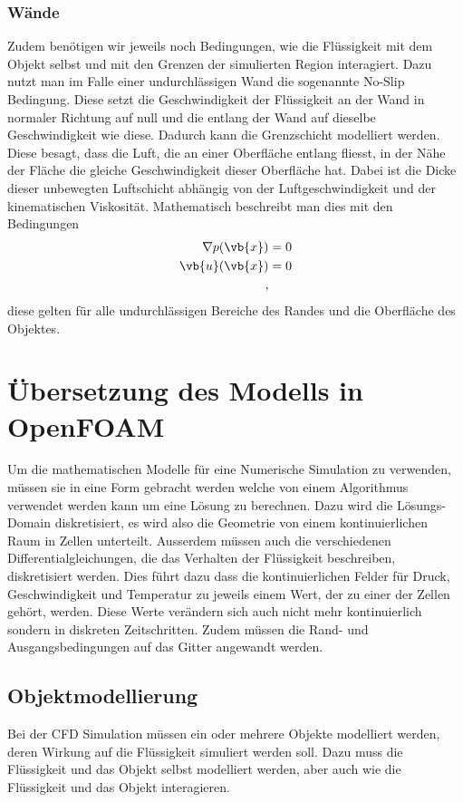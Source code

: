 \subsubsection{Wände}
Zudem benötigen wir jeweils noch Bedingungen, wie die Flüssigkeit mit dem Objekt selbst und mit den Grenzen der simulierten Region interagiert.
Dazu nutzt man im Falle einer undurchlässigen Wand die sogenannte No-Slip Bedingung. 
Diese setzt die Geschwindigkeit der Flüssigkeit an der Wand in normaler Richtung auf null und die entlang der Wand auf dieselbe Geschwindigkeit wie diese.
Dadurch kann die Grenzschicht modelliert werden. Diese besagt, dass die Luft, die an einer Oberfläche entlang fliesst, in der Nähe der Fläche die gleiche Geschwindigkeit dieser Oberfläche hat.
Dabei ist die Dicke dieser unbewegten Luftschicht abhängig von der Luftgeschwindigkeit und der kinematischen Viskosität.
Mathematisch beschreibt man dies mit den Bedingungen
\begin{align*}
 \nabla p(\vb{x}) &= 0 \\
\vb{u}(\vb{x}) &= 0 \\
,\end{align*}
diese gelten für alle undurchlässigen Bereiche des Randes und die Oberfläche des Objektes.

\section{Übersetzung des Modells in OpenFOAM}
Um die mathematischen Modelle für eine Numerische Simulation zu verwenden, müssen sie in eine Form gebracht werden welche von einem Algorithmus verwendet werden kann um eine Lösung zu berechnen.
Dazu wird die Lösungs-Domain diskretisiert, es wird also die Geometrie von einem kontinuierlichen Raum in Zellen unterteilt.
Ausserdem müssen auch die verschiedenen Differentialgleichungen, die das Verhalten der Flüssigkeit beschreiben, diskretisiert werden.
Dies führt dazu dass die kontinuierlichen Felder für Druck, Geschwindigkeit und Temperatur zu jeweils einem Wert, der zu einer der Zellen gehört, werden.
Diese Werte verändern sich auch nicht mehr kontinuierlich sondern in diskreten Zeitschritten.
Zudem müssen die Rand- und Ausgangsbedingungen auf das Gitter angewandt werden.


\subsection{Objektmodellierung}
Bei der CFD Simulation müssen ein oder mehrere Objekte modelliert werden, deren Wirkung auf die Flüssigkeit simuliert werden soll. 
Dazu muss die Flüssigkeit und das Objekt selbst modelliert werden, aber auch wie die Flüssigkeit und das Objekt interagieren.

